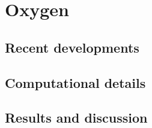 \chapter{Oxygen}
\section{Recent developments}
\section{Computational details}
\section{Results and discussion}
